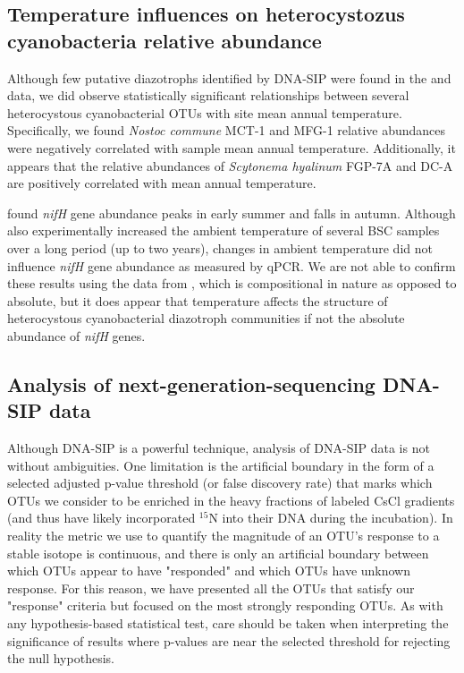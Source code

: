 \subsection{Temperature influences on heterocystozus cyanobacteria relative abundance} 
Although few putative diazotrophs identified by DNA-SIP were found
in the \citet{Garcia_Pichel_2013} and \citet{Steven_2013} data, we did observe
statistically significant relationships between several heterocystous
cyanobacterial OTUs with site mean annual temperature. Specifically, we found
\textit{Nostoc commune} MCT-1 and MFG-1 relative abundances were negatively
correlated with sample mean annual temperature. Additionally, it appears that
the relative abundances of \textit{Scytonema hyalinum} FGP-7A and DC-A are
positively correlated with mean annual temperature.

\citet{Yeager_2012} found \textit{nifH} gene abundance peaks in early summer
and falls in autumn. Although \citet{Yeager_2012} also experimentally
increased the ambient temperature of several BSC samples
over a long period (up to two years), changes in ambient temperature did not
influence \textit{nifH} gene abundance as measured by qPCR. We are not able to
confirm these results using the data from \citet{Garcia_Pichel_2013}, which is
compositional in nature as opposed to absolute, but it does appear that
temperature affects the structure of heterocystous cyanobacterial diazotroph
communities if not the absolute abundance of \textit{nifH} genes. 

\subsection{Analysis of next-generation-sequencing DNA-SIP data}
Although DNA-SIP is a powerful technique, analysis of DNA-SIP data is not
without ambiguities. One limitation is the artificial boundary in the form of a
selected adjusted p-value threshold (or false discovery rate) that marks which
OTUs we consider to be enriched in the heavy fractions of labeled CsCl
gradients (and thus have likely incorporated $^{15}$N into their DNA during the
incubation). In reality the metric we use to quantify the magnitude of an OTU's
response to a stable isotope is continuous, and there is only an artificial
boundary between which OTUs appear to have "responded" and which OTUs have
unknown response. For this reason, we have presented all the OTUs that satisfy
our "response" criteria but focused on the most strongly responding OTUs. As
with any hypothesis-based statistical test, care should be taken when
interpreting the significance of results where p-values are near the selected
threshold for rejecting the null hypothesis.

